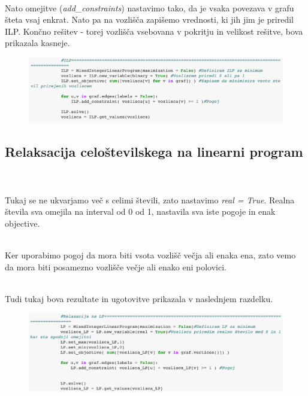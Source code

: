 \documentclass[12pt,a4paper]{amsart}
\theoremstyle{definition} %
\theoremstyle{plain} %
\begin{document}
 \hspace*{\fill} %
\\
Nato omejitve (\textit{add\_constraints}) nastavimo tako, da je vsaka povezava v grafu šteta vsaj enkrat. Nato pa na vozlišča zapišemo vrednosti, ki jih jim je priredil ILP. Končno rešitev - torej vozlišča vsebovana v pokritju in velikost rešitve, bova prikazala kasneje. 


\begin{figure}[ht]
\centering
\includegraphics[width=1\textwidth]{Screen4.png}
\end{figure}

\newpage

\subsection{Relaksacija celoštevilskega na linearni program}
\
\\
\\
Tukaj se ne ukvarjamo več s celimi števili, zato nastavimo \textit{real = True}. Realna števila sva omejila na interval od 0 od 1, nastavila sva iste pogoje in enak objective.

 \hspace*{\fill} %
\\
Ker uporabimo pogoj da mora biti vsota vozlišč večja ali enaka ena, zato vemo da mora biti posamezno vozlišče večje ali enako eni polovici. 

 \hspace*{\fill} %
\\ 
 Tudi tukaj bova rezultate in ugotovitve prikazala v naslednjem razdelku. 


\begin{figure}[ht]
\centering
\includegraphics[width=1\textwidth]{Screen5.png}
\end{figure}
\end{document}
